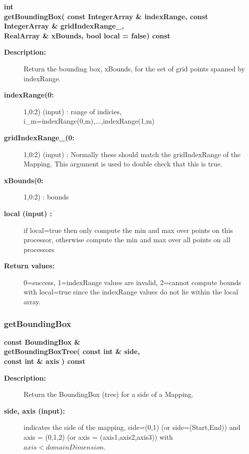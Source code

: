 \begin{flushleft} \textbf{%
int  \\ 
\settowidth{\MappingIncludeArgIndent}{getBoundingBox(}%
getBoundingBox( const IntegerArray \& indexRange, const IntegerArray \& gridIndexRange\_,\\ 
\hspace{\MappingIncludeArgIndent}RealArray \& xBounds, bool local  = false) const
}\end{flushleft}
\begin{description}
\item[{\bf Description:}] 
   Return the bounding box, xBounds, for the set of grid points spanned by 
   indexRange. 

\item[{\bf indexRange(0:}] 1,0:2) (input) : range of indicies, i\_m=indexRange(0,m),...,indexRange(1,m)
\item[{\bf gridIndexRange\_(0:}] 1,0:2) (input) : Normally these should match the gridIndexRange of the Mapping.
    This argument is used to double check that this is true.
\item[{\bf xBounds(0:}] 1,0:2) : bounds
\item[{\bf local (input) :}]  if local=true then only compute the min and max over points on this processor, otherwise
                  compute the min and max over all points on all processors

\item[{\bf Return values:}]  0=success, 1=indexRange values are invalid, 2=cannot compute bounds with local=true since
   the indexRange values do not lie within the local array.
\end{description}
\subsubsection{getBoundingBox}
 
\begin{flushleft} \textbf{%
const BoundingBox \&     \\ 
\settowidth{\MappingIncludeArgIndent}{getBoundingBoxTree(}%
getBoundingBoxTree( const int \& side, \\ 
\hspace{\MappingIncludeArgIndent}const int \& axis ) const
}\end{flushleft}
\begin{description}
\item[{\bf Description:}] 
   Return the BoundingBox (tree) for a side of a Mapping.
\item[{\bf side, axis (input):}]  indicates the side of the mapping, side=(0,1) (or side=(Start,End)) 
     and axis = (0,1,2) (or axis = (axis1,axis2,axis3)) with $axis<domainDimension$.
\end{description}
